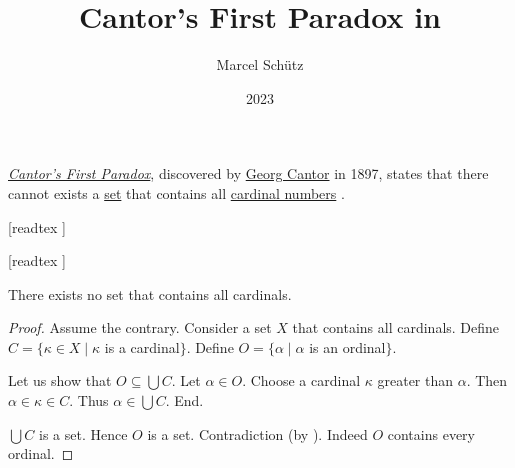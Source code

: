 \documentclass[english]{article}
\begin{document}
\title{Cantor's First Paradox in \Naproche}
\author{Marcel Schütz}
\date{2023}
\maketitle

\noindent \href{https://en.wikipedia.org/wiki/Cantor%27s_paradox}{\emph{Cantor's First Paradox}}, discovered by \href{https://en.wikipedia.org/wiki/Georg_Cantor}{Georg Cantor} in 1897, states that there cannot exists a \href{https://en.wikipedia.org/wiki/Set_(mathematics)}{set} that contains all \href{https://en.wikipedia.org/wiki/Cardinal_number}{cardinal numbers} \cite[chapter 156]{Cantor1991}.

\begin{forthel}
  [readtex ]

  [readtex ]

  \begin{theorem*}\label{cantor_paradox_1}
    There exists no set that contains all cardinals.
  \end{theorem*}
  \begin{proof}
    Assume the contrary.
    Consider a set $X$ that contains all cardinals.
    Define $C = \{ \kappa \in X \mid \kappa$ is a cardinal$\}$.
    Define $O = \{ \alpha \mid \alpha$ is an ordinal$\}$.

    Let us show that $O \subseteq \bigcup C$.
      Let $\alpha \in O$.
      Choose a cardinal $\kappa$ greater than $\alpha$.
      Then $\alpha \in \kappa \in C$.
      Thus $\alpha \in \bigcup C$.
    End.

    $\bigcup C$ is a set.
    Hence $O$ is a set.
    Contradiction (by ).
    Indeed $O$ contains every ordinal.
  \end{proof}
\end{forthel}

\printbibliography
\vfill
\doclicenseThis
\end{document}
